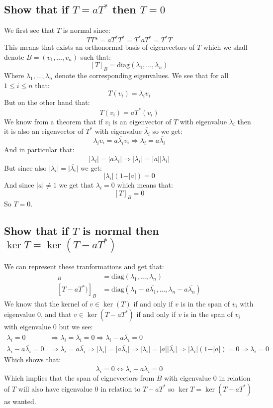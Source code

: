 \documentclass[11pt,a4paper]{article}
\theoremstyle{plain}
\begin{document}
	\subsection{Show that if $T=aT^{*}$ then $T=0$}
	We first see that $T$ is normal since:
	\[
		TT* = aT^*T^* = T^*aT^* = T^*T
	\]
	This means that exists an orthonormal basis of eigenvectors of $T$ which
	we shall denote $B=(v_1,\dots,v_n)$ such that:
	\[
		[T]_B = \text{diag}(\lambda_1,\dots,\lambda_n)
	\]
	Where $\lambda_1,\dots,\lambda_n$ denote the corresponding eigenvalues.
	We see that for all $1\le i \le n$ that:
	\[
		T(v_i) = \lambda_i v_i
	\]
	But on the other hand that:
	\[
		T(v_i) = aT^*(v_i)
	\]
	We know from a theorem that if $v_i$ is an eigenvector of $T$ with 
	eigenvalue $\lambda_i$ then it is also an eigenvector of $T^*$ with
	eigenvalue $\overline{\lambda_i}$ so we get:
	\[
		\lambda_i v_i = a \overline{\lambda_i} v_i \Rightarrow
		\lambda_i = a \overline{\lambda_i}
	\]
	And in particular that:
	\[
		\vert \lambda_i \vert = \vert a \overline{\lambda_i} \vert \Rightarrow
		\vert \lambda_i \vert = \vert a \vert \vert \overline{\lambda_i} \vert
	\]
	But since also $\vert \lambda_i \vert = \vert \overline{\lambda_i} \vert$
	we get:
	\[
		\vert \lambda_i \vert (1-\vert a \vert) = 0
	\]
	And since $\vert a \vert \neq 1$ we get that $\lambda_i = 0$ which means
	that:
	\[
		[T]_B = 0
	\]
	So $T = 0$.
	
	\newpage
	
	\subsection{Show that if $T$ is normal then $\ker T = \ker(T - aT^{*})$}
	We can represent these tranformations and get that:
	\begin{align*}
		[T]_B &= \text{diag}(\lambda_1,\dots,\lambda_n) \\
		[T - aT^{*})]_B &= \text{diag}(\lambda_1 - a \overline{\lambda_1},\dots,
		\lambda_n - a \overline{\lambda_n})
	\end{align*}
	We know that the kernel of $v\in \ker(T)$ if and only if $v$ is in the span
	of $v_i$ with eigenvalue $0$, and that $v\in \ker(T - aT^{*})$ if and only
	if $v$ is in the span of $v_i$ with eigenvalue $0$ but we see:
	\begin{align*}
		\lambda_i = 0 &\Rightarrow \lambda_i = \overline{\lambda_i} = 0 
		\Rightarrow \lambda_i - a \overline{\lambda_i} = 0 \\
		\lambda_i - a \overline{\lambda_i} = 0 &\Rightarrow
		\lambda_i = a \overline{\lambda_i} \Rightarrow
		\vert \lambda_i \vert = \vert a \overline{\lambda_i} \vert \Rightarrow
		\vert \lambda_i \vert = \vert a \vert \vert \overline{\lambda_i} \vert
		\Rightarrow \vert \lambda_i \vert (1-\vert a \vert) = 0 \Rightarrow
		\lambda_i = 0
	\end{align*}
	Which shows that:
	\[
		\lambda_i = 0 \iff \lambda_i - a \overline{\lambda_i} = 0
	\]
	Which implies that the span of eignevectors from $B$ with eigenvalue
	$0$ in relation of $T$ will also have eigenvalue $0$ in relation to
	$T - aT^{*}$ so $\ker T = \ker(T - aT^{*})$ as wanted.
	
\end{document}
